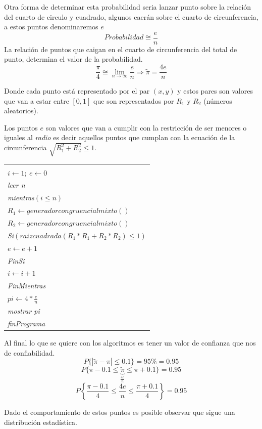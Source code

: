 \documentclass[11pt,letterpaper]{report}
\newenvironment{algoritmo}
  {\begin{center}\begin{tabular}{|p{0.85\textwidth}|}\hline\vspace{-0.2cm}\begin{tabbing}\hspace{0.6cm}\=\hspace{0.6cm}\=\hspace{0.6cm}\=\hspace{0.6cm}\=\hspace{0.6cm}\=\kill}
  {\end{tabbing}\vspace{-0.4cm}\\\hline\end{tabular}\end{center}}
\begin{document}
Otra forma de determinar esta probabilidad seria lanzar punto sobre la relación del cuarto de circulo y cuadrado, algunos caerán sobre el cuarto de circunferencia, a estos puntos denominaremos $e$
\[
Probabilidad \cong \frac{e}{n}
\]
La relación de puntos que caigan en el cuarto de circunferencia del total de punto, determina el valor de la probabilidad.
\[
\frac{\pi}{4} \cong \lim_{n \to \infty}\frac{e}{n} \Longrightarrow \tilde{\pi} = \frac{4e}{n}
\]

Donde cada punto está representado por el par $(x, y)$ y estos pares son valores que van a estar entre $[0, 1]$ que son representados por $R_1$ y $R_2$ (números aleatorios).

Los puntos $e$ son valores que van a cumplir con la restricción de ser menores o iguales al \textit{radio} es decir aquellos puntos que cumplan con la ecuación de la circunferencia $\sqrt{R_1^2 + R_2^2} \leq 1$.

\begin{algoritmo}
\textit{ProgramaCalculoPI}\\
\>$i \leftarrow 1;\ e \leftarrow 0$\\
\>\textit{leer n}\\
\>\textit{mientras}$(i \leq n)$\\
\>\>$R_1 \leftarrow generadorcongruencialmixto()$\\
\>\>$R_2 \leftarrow generadorcongruencialmixto()$\\
\>\>\textit{Si}$(raizcuadrada(R_1 * R_1 + R_2 * R_2) \leq 1)$\\
\>\>\>$e \leftarrow e + 1$\\
\>\>\textit{FinSi}\\
\>\>$i \leftarrow i + 1$\\
\>\textit{FinMientras}\\
\>$pi \leftarrow 4 * \frac{e}{n}$\\
\>\textit{mostrar pi}\\
\textit{finPrograma}
\end{algoritmo}

Al final lo que se quiere con los algoritmos es tener un valor de confianza que nos de confiabilidad.
\[
P\{|\tilde{\pi} - \pi| \leq 0.1\} = 95\% = 0.95
\]
\[
P\{\pi - 0.1 \leq \underbrace{\tilde{\pi}}_{\frac{4e}{n}} \leq \pi + 0.1\} = 0.95
\]
\[
P\left\{\frac{\pi - 0.1}{4} \leq \frac{4e}{n} \leq \frac{\pi + 0.1}{4}\right\} = 0.95
\]

Dado el comportamiento de estos puntos es posible observar que sigue una distribución estadística.
\end{document}
